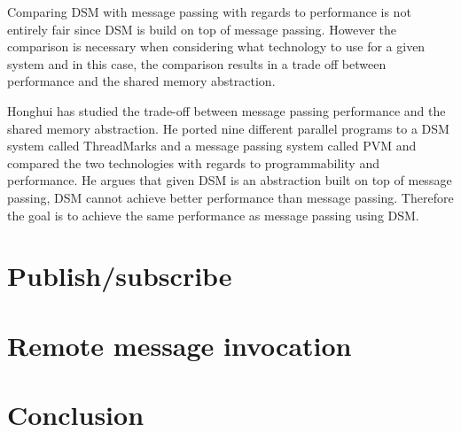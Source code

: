 Comparing DSM with message passing with regards to performance is not entirely fair since DSM is build on top of message passing. However the comparison is necessary when considering what technology to use for a given system and in this case, the comparison results in a trade off between performance and the shared memory abstraction. 

Honghui \cite{lu1995message} has studied the trade-off between message passing performance and the shared memory abstraction. He ported nine different parallel programs to a DSM system called ThreadMarks and a message passing system called PVM and compared the two technologies with regards to programmability and performance. He argues that given DSM is an abstraction built on top of message passing, DSM cannot achieve better performance than message passing. Therefore the goal is to achieve the same performance as message passing using DSM. 




\section{Publish/subscribe}


\section{Remote message invocation}


\section{Conclusion}

